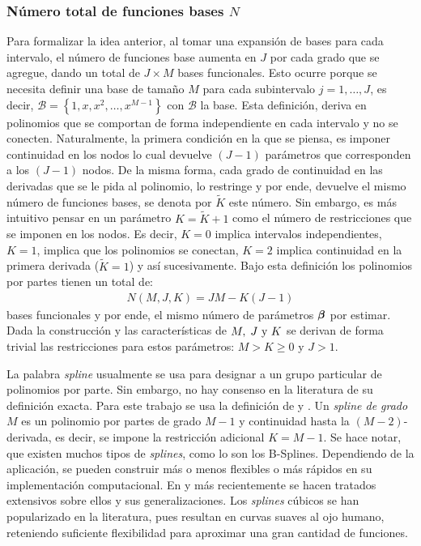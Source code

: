 \documentclass[../Main/Main.tex]{subfiles}
\begin{document}
\subsubsection*{Número total de funciones bases $N$}
Para formalizar la idea anterior, al tomar una expansión de bases para cada intervalo, el número de funciones base aumenta en $J$ por cada grado que se agregue, dando un total de $J\times M$ bases funcionales. Esto ocurre porque se necesita definir una base de tamaño $M$ para cada subintervalo $j = 1,\ldots,J$, es decir, $\mathcal{B} = \left\{1,x,x^2,\ldots,x^{M-1}\right\}$ con $\mathcal{B}$ la base. Esta definición, deriva en polinomios que se comportan de forma independiente en cada intervalo y no se conecten. Naturalmente, la primera condición en la que se piensa, es imponer continuidad en los nodos lo cual devuelve $(J-1)$ parámetros que corresponden a los $(J-1)$ nodos. De la misma forma, cada grado de continuidad en las derivadas que se le pida al polinomio, lo restringe y por ende, devuelve el mismo número de funciones bases, se denota por $\tilde{K}$ este número. Sin embargo, es más intuitivo pensar en un parámetro $K = \tilde{K} + 1$ como el número de restricciones que se imponen en los nodos. Es decir, $K = 0$ implica intervalos independientes, $K = 1$, implica que los polinomios se conectan, $K = 2$ implica continuidad en la primera derivada ($\tilde{K} = 1$) y así sucesivamente. Bajo esta definición los polinomios por partes tienen un total de:
\begin{align}
	N(M,J,K) = JM - K(J-1) \label{ec:NEstrella}
\end{align}
bases funcionales y por ende, el mismo número de parámetros $\bm{\beta}$ por estimar. Dada la construcción y las características de $M,\;J\text{ y }K$ se derivan de forma trivial las restricciones para estos parámetros: $M > K \geq 0 $ y $J > 1$.

La palabra \textit{spline} usualmente se usa para designar a un grupo particular de polinomios por parte. Sin embargo, no hay consenso en la literatura de su definición exacta. Para este trabajo se usa la definición de \citet{wasserman2007all} y \citet{hastie2008elements}.  Un \textit{spline de grado $M$} es un polinomio por partes de grado $M-1$ y continuidad hasta la $(M-2)$-derivada, es decir, se impone la restricción adicional $K = M - 1$. Se hace notar, que existen muchos tipos de \textit{splines}, como lo son los B-Splines. Dependiendo de la aplicación, se pueden construir más o menos flexibles o más rápidos en su implementación computacional. En \citet{deboor1978splines} y más recientemente \citet{wahba1990splines} se hacen tratados extensivos sobre ellos y sus generalizaciones. Los \textit{splines} cúbicos se han popularizado en la literatura, pues resultan en curvas suaves al ojo humano, reteniendo suficiente flexibilidad para aproximar una gran cantidad de funciones.
\end{document}
